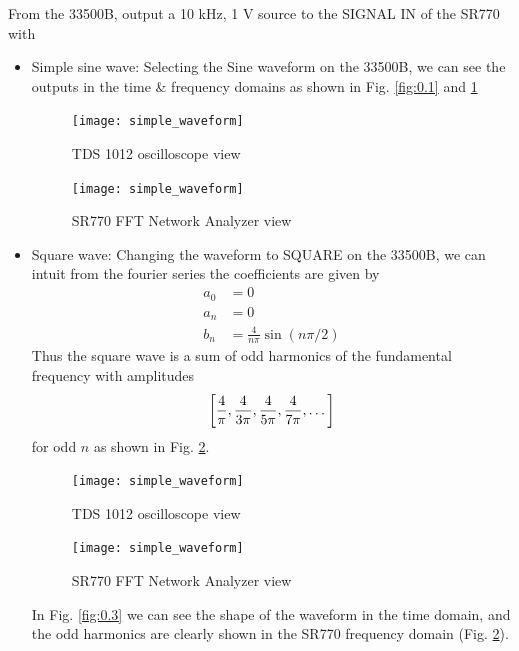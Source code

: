 \documentclass[../main.tex]{subfiles}
\begin{document}
From the 33500B, output a 10 kHz, 1 V source to the SIGNAL IN of the SR770 with 
\begin{itemize}
    \item Simple sine wave: Selecting the Sine waveform on the 33500B, we can see the outputs in the time \& frequency domains
    as shown in Fig. \ref{fig:0.1} and \ref{fig:0.2}
    \begin{figure}[ht]
        \centering
        \begin{minipage}{0.5\textwidth}
            \centering
            \texttt{[image: simple\_waveform]}
            \caption{TDS 1012 oscilloscope view}
            \label{fig:0.1}
        \end{minipage}\hfill
        \begin{minipage}{0.5\textwidth}
            \centering
            \texttt{[image: simple\_waveform]}
            \caption{SR770 FFT Network Analyzer view}
            \label{fig:0.2}
        \end{minipage}
    \end{figure}
    \newpage
    \item Square wave: Changing the waveform to SQUARE on the 33500B, we can intuit from the fourier series the coefficients are given by
    \begin{align*}
        a_0 &= 0 \\
        a_n &= 0 \\
        b_n &= \frac{4}{n\pi} \sin(n\pi/2)
    \end{align*}
    Thus the square wave is a sum of odd harmonics of the fundamental frequency with amplitudes
    \begin{align*}
        \qt[\frac{4}{\pi}, \frac{4}{3\pi}, \frac{4}{5\pi}, \frac{4}{7\pi}, \dots]
    \end{align*}
    for odd $n$ as shown in Fig. \ref{fig:0.4}.
    \begin{figure}[ht]
        \centering
        \begin{minipage}{0.5\textwidth}
            \centering
            \texttt{[image: simple\_waveform]}
            \caption{TDS 1012 oscilloscope view}
            \label{fig:0.3}
        \end{minipage}\hfill
        \begin{minipage}{0.5\textwidth}
            \centering
            \texttt{[image: simple\_waveform]}
            \caption{SR770 FFT Network Analyzer view}
            \label{fig:0.4}
        \end{minipage}
    \end{figure}
    In Fig. \ref{fig:0.3} we can see the shape of the waveform in the time domain,
    and the odd harmonics are clearly shown in the SR770 frequency domain (Fig. \ref{fig:0.4}). 


\end{itemize}
\end{document}
